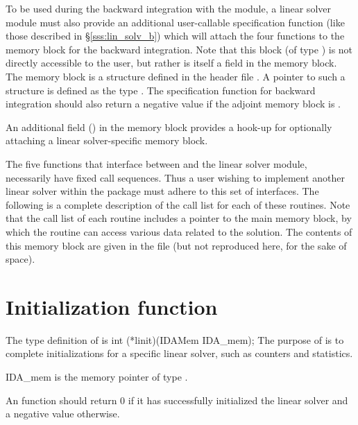 To be used during the backward integration with the {\idas} module,
a linear solver module must also provide an additional user-callable
specification function (like those described in
\S\ref{sss:lin_solv_b}) which will attach the four functions to the
{\idas} memory block for the backward integration. Note that this
block (of type ) is not directly accessible to
the user, but rather is itself a field in the
{\idas} memory block.  The {\idas} memory block is a structure
defined in the header file .  A pointer to such a
structure is defined as the type .
The specification function for backward integration should also return
a negative value if the adjoint {\idas} memory block is .

An additional field () in the {\idas} memory block
provides a hook-up for optionally attaching a linear solver-specific
memory block.

The five functions that interface between {\idas} and the linear solver module,
necessarily have fixed call sequences.  Thus a user wishing to implement another 
linear solver within the {\idas} package must adhere to this set of interfaces.
The following is a complete description of the call list for each of
these routines.  Note that the call list of each routine includes a
pointer to the main {\idas} memory block, by which the routine can access
various data related to the {\idas} solution.  The contents of this memory
block are given in the file  (but not reproduced here, for
the sake of space).


\section{Initialization function}
The type definition of  is
{
  int (*linit)(IDAMem IDA\_mem);
}
{
  The purpose of  is to complete initializations for      
  a specific linear solver, such as counters and statistics.        
}
{
  \begin{args}
  \item[IDA\_mem]
    is the {\idas} memory pointer of type .
  \end{args}
}
{
  An  function should return $0$ if it 
  has successfully initialized the {\idas} linear solver and 
  a negative value otherwise. 
}
{}

